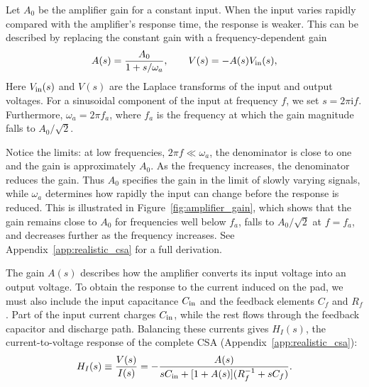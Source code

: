 Let $A_0$ be the amplifier gain for a constant input. When the input varies rapidly compared with the amplifier's response time, the response is weaker. This can be described by replacing the constant gain with a frequency-dependent gain
%
\begin{equation}
 A(s)=\frac{A_0}{1+s/\omega_a},\qquad V(s)=-A(s)V_{\rm in}(s),
 \label{eq:realistic_gain}
\end{equation}
%
Here $V_{\rm in}(s)$ and $V(s)$ are the Laplace transforms of the input and output voltages. For a sinusoidal component of the input at frequency $f$, we set $s=2\pi\mathrm{i}f$.  Furthermore, $\omega_a=2\pi f_a$, where $f_a$ is the frequency at which the gain magnitude falls to $A_0/\sqrt{2}$.

Notice the limits: at low frequencies, $2\pi f\ll\omega_a$, the denominator is close to one and the gain is approximately $A_0$. As the frequency increases, the denominator reduces the gain. Thus $A_0$ specifies the gain in the limit of slowly varying signals, while $\omega_a$ determines how rapidly the input can change before the response is reduced. This is illustrated in Figure~\ref{fig:amplifier_gain}, which shows that the gain remains close to $A_0$ for frequencies well below $f_a$, falls to $A_0/\sqrt{2}$ at $f=f_a$, and decreases further as the frequency increases. See Appendix~\ref{app:realistic_csa}  for a full derivation.


The gain $A(s)$ describes how the amplifier converts its input voltage into an output voltage. To obtain the response to the current induced on the pad, we must also include the input capacitance $C_{\rm in}$ and the feedback elements $C_f$ and $R_f$. Part of the input current charges $C_{\rm in}$, while the rest flows through the feedback capacitor and discharge path. Balancing these currents gives $H_I(s)$, the current-to-voltage response of the complete CSA (Appendix~\ref{app:realistic_csa}):
%
\begin{equation}
 H_I(s)\equiv\frac{V(s)}{I(s)}
 =-\frac{A(s)}{sC_{\rm in}+[1+A(s)](R_f^{-1}+sC_f)}.
 \label{eq:realistic_transimpedance}
\end{equation}
%

